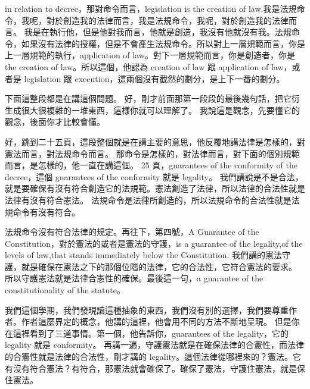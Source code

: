 \hypertarget{w05:cue:63}{}in relation to decree，那對命令而言，legislation is the creation of law.我是法規命令，我呢，對於創造我的法律而言，我是法規命令，我呢，對於創造我的法律而言。
\hypertarget{w05:cue:64}{}我是在執行他，但是他對我而言，他就是創造，我沒有他就沒有我。法規命令，如果沒有法律的授權，但是不會產生法規命令。所以對上一層規範而言，你是上一層規範的執行，application of law。對下一層規範而言，你是創造者，你是 the creation of law。所以這個，他認為 creation of law 跟 application of law，或者是 legislation 跟 execution，這兩個沒有截然的劃分，是上下一番的劃分。

\hypertarget{w05:cue:65}{}下面這整段都是在講這個問題。
\hypertarget{w05:cue:66}{}好，剛才前面那第一段段的最後幾句話，把它衍生成很大很複雜的一堆東西，這樣你就可以理解了。
\hypertarget{w05:cue:67}{}我說這是觀念，先要懂它的觀念，後面你才比較會懂。

\hypertarget{w05:cue:68}{}好，跳到二十五頁，這段整個就是在講主要的意思，他反覆地講法律是怎樣的，對憲法而言，對法規命令而言。
\hypertarget{w05:cue:69}{}那命令是怎樣的，對法律而言，對下面的個別規範而言，是怎樣的，他一直在講這個。
\hypertarget{w05:cue:70}{}25 頁，guarantees of the conformity of the decree，這個 guarantees of the conformity 就是 legality。
\hypertarget{w05:cue:71}{}我們講說是不是合法，就是要確保有沒有符合創造它的法規範。憲法創造了法律，所以法律的合法性就是法律有沒有符合憲法。
\hypertarget{w05:cue:72}{}法規命令是法律所創造的，所以法規命令的合法性就是法規命令有沒有符合。

\hypertarget{w05:cue:73}{}法規命令沒有符合法律的規定。再往下，第四號，A Guarantee of the Constitution，對於憲法的或者是憲法的守護，is a guarantee of the legality,of the levels of law,that stands immediately below the Constitution.
\hypertarget{w05:cue:74}{}我們講的憲法守護，就是確保在憲法之下的那個位階的法律，它的合法性，它符合憲法的要求。
\hypertarget{w05:cue:75}{}所以守護憲法就是法律合憲性的確保。最後這一句，a guarantee of the constitutionality of the statute。

\hypertarget{w05:cue:76}{}我們這個學期，我們發現讀這種抽象的東西，我們沒有別的選擇，我們要尊重作者。作者這麼界定的概念，他講的這裡，他會用不同的方法不斷地呈現。
\hypertarget{w05:cue:77}{}但是你在這裡看到了三道事情。第一個，他告訴你，guarantees of the legality，它的 legality 就是 conformity。
\hypertarget{w05:cue:78}{}再講一遍，守護憲法就是在確保法律的合憲性，而法律的合憲性就是法律的合法性，剛才講的 legality。這個法律從哪裡來的？憲法。它有沒有符合憲法？有符合，那憲法就會確保了。確保了憲法，守護住憲法，就是保住憲法。


